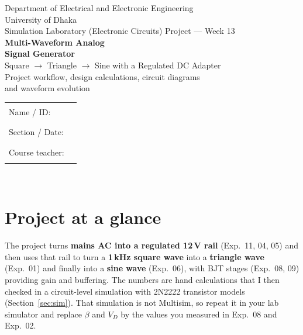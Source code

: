 \begin{titlepage}
\centering
\vspace*{1.2cm}
{\Large Department of Electrical and Electronic Engineering\\ University of Dhaka}\\[0.5cm]
{\large Simulation Laboratory (Electronic Circuits) \quad Project --- Week 13}\\[1.4cm]
{\Huge\bfseries Multi-Waveform Analog\\[4pt] Signal Generator}\\[0.5cm]
{\Large Square $\rightarrow$ Triangle $\rightarrow$ Sine with a Regulated DC Adapter}\\[0.8cm]
{\large Project workflow, design calculations, circuit diagrams\\ and waveform evolution}\\[1.2cm]


\vfill
\begin{tabular}{ll}
Name / ID: & \rule{6cm}{0.4pt}\\[6pt]
Section / Date: & \rule{6cm}{0.4pt}\\[6pt]
Course teacher: & \rule{6cm}{0.4pt}
\end{tabular}\\[1cm]
\end{titlepage}

\tableofcontents
\newpage

\section{Project at a glance}
The project turns \textbf{mains AC into a regulated 12\,V rail} (Exp.\ 11, 04, 05) and then uses that rail to turn a \textbf{1\,kHz square wave} into a \textbf{triangle wave} (Exp.\ 01) and finally into a \textbf{sine wave} (Exp.\ 06), with BJT stages (Exp.\ 08, 09) providing gain and buffering. The numbers are hand calculations that I then checked in a circuit-level simulation with 2N2222 transistor models (Section~\ref{sec:sim}). That simulation is not Multisim, so repeat it in your lab simulator and replace $\beta$ and $V_D$ by the values you measured in Exp.~08 and Exp.~02.

